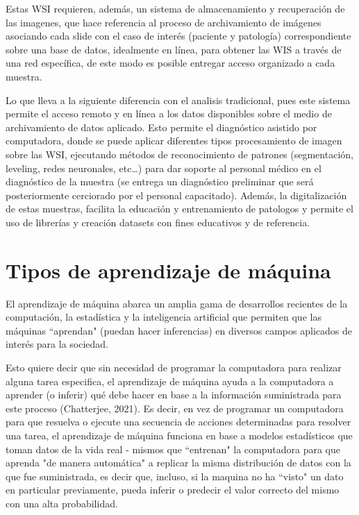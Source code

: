 \documentclass[12pt,letterpaper,final, openany]{scrbook}
\begin{document}
Estas WSI requieren, además, un sistema de almacenamiento y recuperación de las imagenes, que hace referencia al proceso de archivamiento de imágenes asociando cada slide con el caso de interés (paciente y patología) correspondiente sobre una base de datos, idealmente en línea, para obtener las WIS a través de una red específica, de este modo es posible entregar acceso organizado a cada muestra. 

Lo que lleva a la siguiente diferencia con el analisis tradicional, pues este sistema permite el acceso remoto y en línea a los datos disponibles sobre el medio de archivamiento de datos aplicado. Esto permite el diagnóstico asistido por computadora, donde se puede aplicar diferentes tipos procesamiento de imagen sobre las WSI, ejecutando métodos de reconocimiento de patrones (segmentación, leveling, redes neuronales, etc…) para dar soporte al personal médico en el diagnóstico de la muestra (se entrega un diagnóstico preliminar que será posteriormente cerciorado por el personal capacitado). Además, la digitalización de estas muestras, facilita la educación y entrenamiento de patologos y permite el uso de librerías y creación datasets con fines educativos y de referencia.

\section{Tipos de aprendizaje de máquina}

El aprendizaje de máquina abarca un amplia gama de desarrollos recientes de la computación, la estadística y la inteligencia artificial que permiten que las máquinas ``aprendan" (puedan hacer inferencias) en diversos campos aplicados de interés para la sociedad.

Esto quiere decir que sin necesidad de programar la computadora para realizar alguna tarea especifica, el aprendizaje de máquina ayuda a la computadora a aprender (o inferir) qué debe hacer en base a la información suministrada para este proceso (Chatterjee, 2021). Es decir, en vez de programar un computadora para que resuelva o ejecute una secuencia de acciones determinadas para resolver una tarea, el aprendizaje de máquina funciona en base a modelos estadísticos que toman datos de la vida real - mismos que ``entrenan" la computadora para que aprenda "de manera automática" a replicar la misma distribución de datos con la que fue suministrada, es decir que, incluso, si la maquina no ha ``visto" un dato en particular previamente, pueda inferir  o predecir el valor correcto del mismo con una alta probabilidad.
\end{document}
